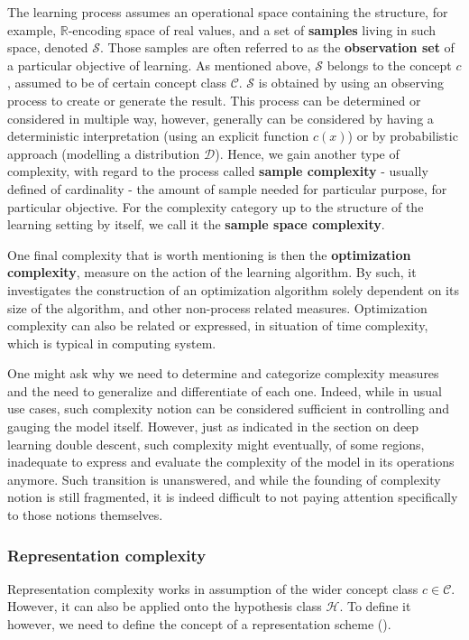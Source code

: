 \documentclass[10pt]{article} %
\begin{document}
The learning process assumes an operational space containing the structure, for example, $\mathbb{R}$-encoding space of real values, and a set of \textbf{samples} living in such space, denoted $\mathcal{S}$. Those samples are often referred to as the \textbf{observation set} of a particular objective of learning. As mentioned above, $\mathcal{S}$ belongs to the concept $c$, assumed to be of certain concept class $\mathcal{C}$. $\mathcal{S}$ is obtained by using an observing process to create or generate the result. This process can be determined or considered in multiple way, however, generally can be considered by having a deterministic interpretation (using an explicit function $c(x)$) or by probabilistic approach (modelling a distribution $\mathcal{D}$). Hence, we gain another type of complexity, with regard to the process called \textbf{sample complexity} - usually defined of cardinality - the amount of sample needed for particular purpose, for particular objective. For the complexity category up to the structure of the learning setting by itself, we call it the \textbf{sample space complexity}. 

One final complexity that is worth mentioning is then the \textbf{optimization complexity}, measure on the action of the learning algorithm. By such, it investigates the construction of an optimization algorithm solely dependent on its size of the algorithm, and other non-process related measures. Optimization complexity can also be related or expressed, in situation of time complexity, which is typical in computing system. 

One might ask why we need to determine and categorize complexity measures and the need to generalize and differentiate of each one. Indeed, while in usual use cases, such complexity notion can be considered sufficient in controlling and gauging the model itself. However, just as \cite{James2021} indicated in the section on deep learning double descent, such complexity might eventually, of some regions, inadequate to express and evaluate the complexity of the model in its operations anymore. Such transition is unanswered, and while the founding of complexity notion is still fragmented, it is indeed difficult to not paying attention specifically to those notions themselves. 

\subsubsection{Representation complexity}

Representation complexity works in assumption of the wider concept class $c\in \mathcal{C}$. However, it can also be applied onto the hypothesis class $\mathcal{H}$. To define it however, we need to define the concept of a representation scheme (\cite{10.5555/200548}). 
\end{document}
